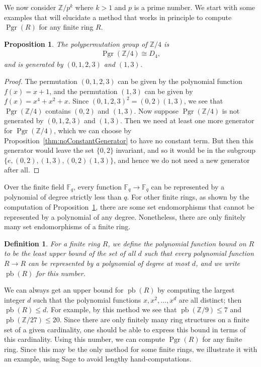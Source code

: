 \documentclass[oneside]{amsart}
\theoremstyle{nthm}
\newtheorem{prop}[subsection]{Proposition}
\theoremstyle{ndef}
\newtheorem{defn}[subsection]{Definition}
\theoremstyle{nrem}
\newcommand{\F}{\mathbb{F}}
\newcommand{\Z}{\mathbb{Z}}
\DeclareMathOperator{\pfb}{pb}
\DeclareMathOperator{\Pgr}{Pgr}
\begin{document}
We now consider $\Z/p^k$ where $k > 1$ and $p$ is a prime number. We start with some examples that will elucidate a method that works in principle to compute $\Pgr(R)$ for any finite ring $R$.
\begin{prop}\label{thm:pgrofzmodefour}
    The polypermutation group of $\Z/4$ is
    \begin{align*}
        \Pgr(\Z/4) \cong D_4,
    \end{align*}
    and is generated by $(0,1,2,3)$ and $(1,3)$.
\end{prop}
\begin{proof}
    The permutation $(0,1,2,3)$ can be given by the polynomial function $f(x) = x + 1$, and the permutation $(1,3)$ can be given by $f(x) = x^4 + x^2 + x$. Since $(0,1,2,3)^2 = (0,2)(1,3)$, we see that $\Pgr(\Z/4)$ contains $(0,2)$ and $(1,3)$. Now suppose $\Pgr(\Z/4)$ is not generated by $(0,1,2,3)$ and $(1,3)$. Then we need at least one more generator for $\Pgr(\Z/4)$, which we can choose by Proposition~\ref{thm:noConstantGenerator} to have no constant term. But then this generator would leave the set $\{0,2\}$ invariant, and so it would be in the subgroup $\{ e, (0,2), (1,3), (0,2)(1,3)\}$, and hence we do not need a new generator after all.
\end{proof}
Over the finite field $\F_q$, every function $\F_q\to\F_q$ can be represented by a polynomial of degree strictly less than $q$. For other finite rings, as shown by the computation of Proposition~\ref{thm:pgrofzmodefour}, there are some set endomorphisms that cannot be represented by a polynomial of any degree. Nonetheless, there are only finitely many set endomorphisms of a finite ring.
\begin{defn}
    For a finite ring $R$, we define the polynomial function bound on $R$ to be the least upper bound of the set of all $d$ such that every polynomial function $R\to R$ can be represented by a polynomial of degree at most $d$, and we write $\pfb(R)$ for this number.
\end{defn}
We can always get an upper bound for $\pfb(R)$ by computing the largest integer $d$ such that the polynomial functions $x,x^2,\dots,x^d$ are all distinct; then $\pfb(R) \leq d$. For example, by this method we see that $\pfb(\Z/9)\leq 7$ and $\pfb(\Z/27)\leq 20$. Since there are only finitely many ring structures on a finite set of a given cardinality, one should be able to express this bound in terms of this cardinality. Using this number, we can compute $\Pgr(R)$ for any finite ring. Since this may be the only method for some finite rings, we illustrate it with an example, using Sage to avoid lengthy hand-computations.
\end{document}
